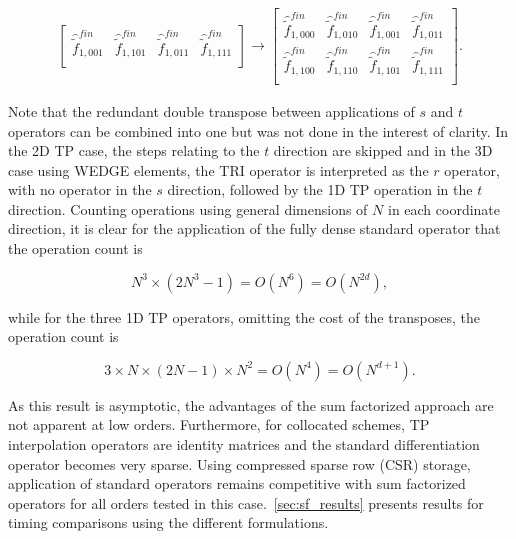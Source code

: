 \documentclass[12pt,Bold,letterpaper,TexShade]{mcgilletdclass}
\numberwithin{equation}{section}
\begin{document}
\begin{enumerate}
\begin{equation}
\begin{split}
\begin{bmatrix}
\hat{\tilde{f}}^{fin}_{1,001} & \hat{\tilde{f}}^{fin}_{1,101} & \hat{\tilde{f}}^{fin}_{1,011} & \hat{\tilde{f}}^{fin}_{1,111} \\
\end{bmatrix}
\rightarrow
\begin{bmatrix}
\hat{\tilde{f}}^{fin}_{1,000} & \hat{\tilde{f}}^{fin}_{1,010} & \hat{\tilde{f}}^{fin}_{1,001} & \hat{\tilde{f}}^{fin}_{1,011} \\
\hat{\tilde{f}}^{fin}_{1,100} & \hat{\tilde{f}}^{fin}_{1,110} & \hat{\tilde{f}}^{fin}_{1,101} & \hat{\tilde{f}}^{fin}_{1,111} \\
\end{bmatrix}.
\end{split}
\end{equation}
\end{enumerate}

Note that the redundant double transpose between applications of $s$ and $t$ operators can be combined into one but was not done in the interest of clarity. In the 2D TP case, the steps relating to the $t$ direction are skipped and in the 3D case using WEDGE elements, the TRI operator is interpreted as the $r$ operator, with no operator in the $s$ direction, followed by the 1D TP operation in the $t$ direction. Counting operations using general dimensions of $N$ in each coordinate direction, it is clear for the application of the fully dense standard operator that the operation count is

\begin{equation}
N^3 \times (2N^3-1) = O(N^6) = O(N^{2d}),
\end{equation}

while for the three 1D TP operators, omitting the cost of the transposes, the operation count is

\begin{equation}
3 \times N \times (2N-1) \times N^2 = O(N^4) = O(N^{d+1}).
\end{equation}

As this result is asymptotic, the advantages of the sum factorized approach are not apparent at low orders. Furthermore, for collocated schemes, TP interpolation operators are identity matrices and the standard differentiation operator becomes very sparse. Using compressed sparse row (CSR) storage, application of standard operators remains competitive with sum factorized operators for all orders tested in this case.~\autoref{sec:sf_results} presents results for timing comparisons using the different formulations.
\end{document}
